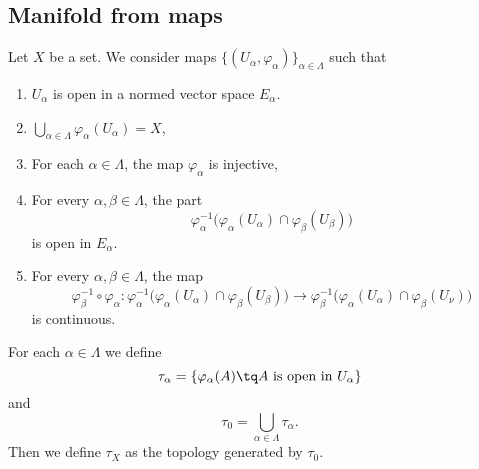 \subsection{Manifold from maps}

\begin{theorem}		\label{THOooFIHIooLiSUxH}
	Let \( X\) be a set. We consider maps \( \{ (U_\alpha,\varphi_{\alpha}) \}_{\alpha\in\Lambda}\) such that
	\begin{enumerate}
		\item		\label{ITEMooDWSWooWdcDdI}
		      \( U_{\alpha}\) is open in a normed vector space \( E_{\alpha}\).
		\item		\label{ITEMooPEXDooNuJBKH}
		      \( \bigcup_{\alpha\in\Lambda}\varphi_{\alpha}(U_{\alpha})=X\),
		\item		\label{ITEMooSRPQooNUPzlj}
		      For each \( \alpha\in \Lambda\), the map \( \varphi_{\alpha}\) is injective,
		\item		\label{ITEMooWFAWooAqQfzZ}
		      For every \( \alpha,\beta\in\Lambda\), the part
		      \begin{equation}
			      \varphi_{\alpha}^{-1}\big( \varphi_{\alpha}(U_{\alpha})\cap \varphi_{\beta}(U_{\beta}) \big)
		      \end{equation}
		      is open in \( E_{\alpha}\).
		\item	\label{ITEMooZHLXooBpWSXr}
		      For every \( \alpha,\beta\in\Lambda\), the map
		      \begin{equation}
			      \varphi_{\beta}^{-1}\circ\varphi_{\alpha} \colon \varphi_{\alpha}^{-1}\big( \varphi_{\alpha}(U_{\alpha})\cap\varphi_{\beta}(U_{\beta}) \big)\to \varphi_{\beta}^{-1}\big( \varphi_{\alpha}(U_{\alpha})\cap\varphi_{\beta}(U_{\nu}) \big)
		      \end{equation}
		      is continuous.
	\end{enumerate}

	For each \( \alpha\in\Lambda\) we define
	\begin{equation}
		\tau_{\alpha}=\{ \varphi_{\alpha}(A)\tq \text{\( A\) is open in \( U_{\alpha}\)} \}
	\end{equation}
	and
	\begin{equation}
		\tau_{0}=\bigcup_{\alpha\in\Lambda}\tau_{\alpha}.
	\end{equation}
	Then we define \( \tau_X\) as the topology generated by \( \tau_0\).


\end{theorem}
